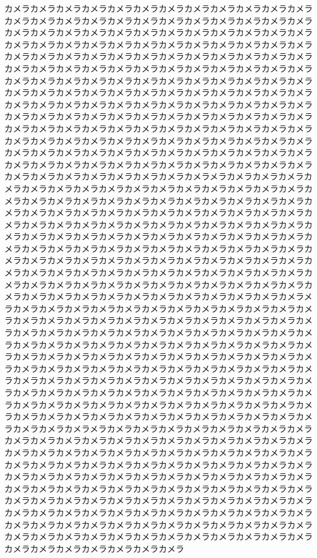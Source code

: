 \documentclass[11pt, a4paper]{jsarticle}
\numberwithin{equation}{section}
\begin{document}
カメラカメラカメラカメラカメラカメラカメラカメラカメラカメラカメラカメラカメラカメラカメラカメラカメラカメラカメラカメラカメラカメラカメラカメラカメラカメラカメラカメラカメラカメラカメラカメラカメラカメラカメラカメラカメラカメラカメラカメラカメラカメラカメラカメラカメラカメラカメラカメラカメラカメラカメラカメラカメラカメラカメラカメラカメラカメラカメラカメラカメラカメラカメラカメラカメラカメラカメラカメラカメラカメラカメラカメラカメラカメラカメラカメラカメラカメラカメラカメラカメラカメラカメラカメラカメラカメラカメラカメラカメラカメラカメラカメラカメラカメラカメラカメラカメラカメラカメラカメラカメラカメラカメラカメラカメラカメラカメラカメラカメラカメラカメラカメラカメラカメラカメラカメラカメラカメラカメラカメラカメラカメラカメラカメラカメラカメラカメラカメラカメラカメラカメラカメラカメラカメラカメラカメラカメラカメラカメラカメラカメラカメラカメラカメラカメラカメラカメラカメラカメラカメラカメラカメラカメラカメラカメラカメラカメラカメラカメラカメラカメラカメラカメラカメラカメラカメラカメラカメラカメラカメラカメラカメラカメラカメラカメラカメラメラカメラカメラカメラカメラカメラカメラカメラカメラカメラカメラカメラカメラカメラカメラカメラカメラカメラカメラカメラカメラカメラカメラカメラカメラカメラカメラカメラカメラカメラカメラカメラカメラカメラカメラカメラカメラカメラカメラカメラカメラカメラカメラカメラカメラカメラカメラカメラカメラカメラカメラカメラカメラカメラカメラカメラカメラカメラカメラカメラカメラカメラカメラカメラカメラカメラカメラカメラカメラカメラカメラカメラカメラカメラカメラカメラカメラカメラカメラカメラカメラカメラカメラカメラカメラカメラカメラカメラカメラカメラカメラカメラカメラカメラカメラカメラカメラカメラカメラカメラカメラカメラカメラカメラカメラカメラカメラカメラカメラカメラカメラカメラカメラカメラカメラカメラカメラカメラカメラカメラカメラカメラカメラカメラメラカメラカメラカメラカメラカメラカメラカメラカメラカメラカメラカメラカメラカメラカメラカメラカメラカメラカメラカメラカメラカメラカメラカメラカメラカメラカメラカメラカメラカメラカメラカメラカメラカメラカメラカメラカメラカメラカメラカメラカメラカメラカメラカメラカメラカメラカメラカメラカメラカメラカメラカメラカメラカメラカメラカメラカメラカメラカメラカメラカメラカメラカメラカメラカメラカメラカメラカメラカメラカメラカメラカメラカメラカメラカメラカメラカメラカメラカメラカメラカメラカメラカメラカメラカメラカメラカメラカメラカメラカメラカメラカメラカメラカメラカメラカメラカメラカメラカメラカメラカメラカメラカメラカメラカメラカメラカメラカメラカメラカメラカメラカメラカメラカメラカメラカメラカメラカメラカメラカメラカメラカメラカメラカメラメラカメラカメラカメラカメラカメラカメラカメラカメラカメラカメラカメラカメラカメラカメラカメラカメラカメラカメラカメラカメラカメラカメラカメラカメラカメラカメラカメラカメラカメラカメラカメラカメラカメラカメラカメラカメラカメラカメラカメラカメラカメラカメラカメラカメラカメラカメラカメラカメラカメラカメラカメラカメラカメラカメラカメラカメラカメラカメラカメラカメラカメラカメラカメラカメラカメラカメラカメラカメラカメラカメラカメラカメラカメラカメラカメラカメラカメラカメラカメラカメラカメラカメラカメラカメラカメラカメラカメラカメラカメラカメラカメラカメラカメラカメラカメラカメラカメラカメラカメラカメラカメラカメラカメラカメラカメラカメラカメラカメラカメラカメラカメラカメラカメラカメラカメラカメラカメラカメラカメラカメラカメラカメラカメラ
\end{document}
